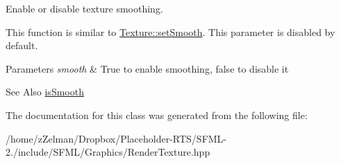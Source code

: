 Enable or disable texture smoothing. 

This function is similar to \hyperlink{classsf_1_1Texture_a0c3bd6825b9a99714f10d44179d74324}{Texture\-::set\-Smooth}. This parameter is disabled by default.


\begin{DoxyParams}{Parameters}
{\em smooth} & True to enable smoothing, false to disable it\\
\hline
\end{DoxyParams}
\begin{DoxySeeAlso}{See Also}
\hyperlink{classsf_1_1RenderTexture_ae385f4f4dbd2af50fb11947bf0bcb83d}{is\-Smooth} 
\end{DoxySeeAlso}


The documentation for this class was generated from the following file\-:\begin{DoxyCompactItemize}
\item 
/home/z\-Zelman/\-Dropbox/\-Placeholder-\/\-R\-T\-S/\-S\-F\-M\-L-\/2./include/\-S\-F\-M\-L/\-Graphics/Render\-Texture.\-hpp\end{DoxyCompactItemize}
